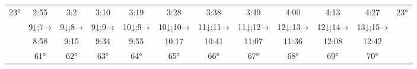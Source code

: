 \begin{scriptsize}
\begin{tabular}{c || c | c | c | c | c | c | c | c | c | c || c}
		\multirow{3}{*}{23°}&2:55&3:2&3:10&3:19&3:28&3:38&3:49&4:00&4:13&4:27&\multirow{3}{*}{23°}\\ \space&9↓;7→&9↓;8→&9↓;9→&10↓;9→&10↓;10→&11↓;11→&11↓;12→&12↓;13→&12↓;14→&13↓;15→&\space\\&8:58&9:15&9:34&9:55&10:17&10:41&11:07&11:36&12:08&12:42&\space\\\hline
		\hline\space &61°&62°&63°&64°&65°&66°&67°&68°&69°&70°
\end{tabular}\end{scriptsize}

%
